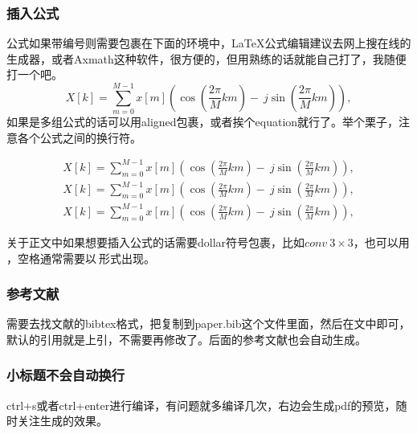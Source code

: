 \subsubsection{插入公式}公式如果带编号则需要包裹在下面的环境中，\LaTeX 公式编辑建议去网上搜在线的生成器，或者Axmath这种软件，很方便的，但用熟练的话就能自己打了，我随便打一个吧。
\begin{equation}
    X\left[ k \right] =\sum_{m=0}^{M-1}{x\left[ m \right] \left( \cos \left( \frac{2\pi}{M}km \right) -\ j\sin \left( \frac{2\pi}{M}km \right) \right)},
\end{equation}
如果是多组公式的话可以用aligned包裹，或者挨个equation就行了。举个栗子，注意各个公式之间的换行符。%

\begin{equation}
    \begin{aligned}
        X\left[ k \right] =\sum_{m=0}^{M-1}{x\left[ m \right] \left( \cos \left( \frac{2\pi}{M}km \right) -\ j\sin \left( \frac{2\pi}{M}km \right) \right)},\\
        X\left[ k \right] =\sum_{m=0}^{M-1}{x\left[ m \right] \left( \cos \left( \frac{2\pi}{M}km \right) -\ j\sin \left( \frac{2\pi}{M}km \right) \right)},\\
        X\left[ k \right] =\sum_{m=0}^{M-1}{x\left[ m \right] \left( \cos \left( \frac{2\pi}{M}km \right) -\ j\sin \left( \frac{2\pi}{M}km \right) \right)},
    \end{aligned}
\end{equation}

关于正文中如果想要插入公式的话需要dollar符号包裹，比如$ conv\ 3 \times 3$，也可以用\( \)，空格通常需要以$\ $形式出现。

\subsubsection{参考文献}需要去找文献的bibtex格式，把复制到paper.bib这个文件里面，然后在文中\cite{nussbaumer1982fast}即可，默认的引用就是上引，不需要再修改了。后面的参考文献也会自动生成。

\subsubsection{小标题不会自动换行}ctrl+s或者ctrl+enter进行编译，有问题就多编译几次，右边会生成pdf的预览，随时关注生成的效果。


\newpage%
